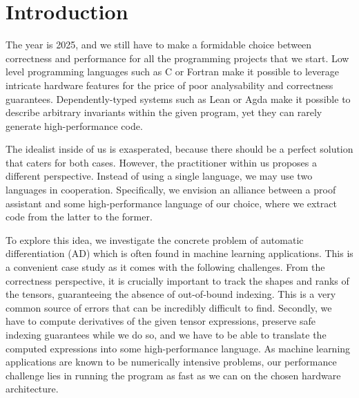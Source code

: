\section{Introduction\label{sec:intro}}


The year is 2025, and we still have to make a formidable choice between
correctness and performance for all the programming projects that we start.
Low level programming languages such as C or Fortran make it possible to leverage
intricate hardware features for the price of poor analysability and
correctness guarantees.  Dependently-typed systems such as Lean or Agda make it possible
to describe arbitrary invariants within the given program, yet they can
rarely generate high-performance code.

The idealist inside of us is exasperated, because there should be a
perfect solution that caters for both cases. However, the practitioner
within us proposes a different perspective. Instead of using a single
language, we may use two languages in cooperation. Specifically, we
envision an alliance between a proof assistant and some
high-performance language of our choice, where we extract code from
the latter to the former.

To explore this idea, we investigate the concrete problem of automatic differentiation (AD) which
is often found in machine learning applications.  This is a convenient case study
as it comes with the following challenges.  From the correctness perspective,
it is crucially important to track the shapes and ranks of the tensors,
guaranteeing the absence of out-of-bound indexing.
This is a very common source of errors that can be incredibly difficult
to find.   Secondly, we have to compute derivatives of the given tensor expressions,
preserve safe indexing guarantees while we do so, and we have to be able to translate
the computed expressions into some high-performance language.
As machine learning applications
are known to be numerically intensive problems, our performance challenge lies
in running the program as fast as we can on the chosen hardware architecture.

